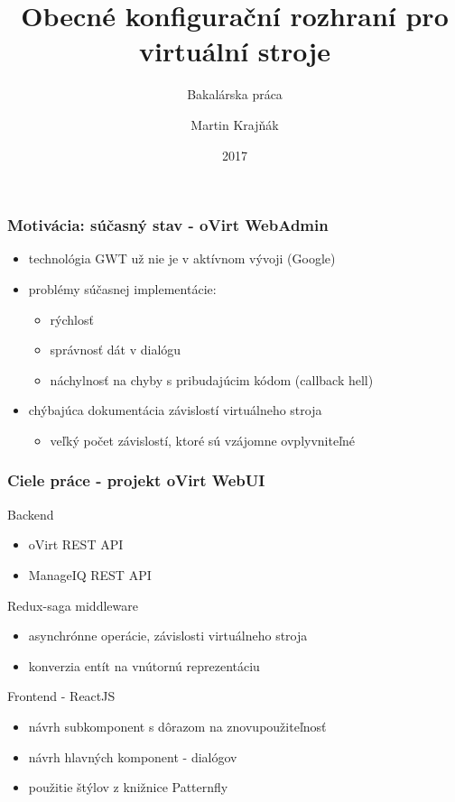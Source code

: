 \documentclass[pdf]{beamer}
\title[Obecné konfigurační rozhraní pro virtuální stroje \hspace{10mm} \insertframenumber/\inserttotalframenumber]{Obecné konfigurační rozhraní pro virtuální stroje}
\subtitle{Bakalárska práca}
\author{Martin Krajňák}
\date{2017}
\begin{document}
\begin{frame}
\titlepage
\end{frame}


\begin{frame}
\frametitle{Motivácia: súčasný stav - oVirt WebAdmin}
\begin{itemize}
\item technológia GWT už nie je v aktívnom vývoji (Google)
\item problémy súčasnej implementácie:
\begin{itemize}
\item rýchlosť
\item správnosť dát v dialógu
\item náchylnosť na chyby s pribudajúcim kódom (callback hell)
\end{itemize}
\item chýbajúca dokumentácia závislostí virtuálneho stroja 
\begin{itemize}
\item veľký počet závislostí, ktoré sú vzájomne ovplyvniteľné
\end{itemize}
\end{itemize}
\end{frame}


\begin{frame}
\frametitle{Ciele práce - projekt oVirt WebUI}
\begin{block}{Backend}

\begin{itemize}
\item oVirt REST API
\item ManageIQ REST API
\end{itemize}

\end{block}

\begin{block}{Redux-saga middleware}

\begin{itemize}
\item asynchrónne operácie, závislosti virtuálneho stroja
\item konverzia entít na vnútornú reprezentáciu
\end{itemize}

\end{block}

\begin{block}{Frontend - ReactJS}
\begin{itemize}
\item návrh subkomponent s dôrazom na znovupoužiteľnosť
\item návrh hlavných komponent - dialógov
\item použitie štýlov z knižnice Patternfly
\end{itemize}
\end{block}

\end{frame}
\end{document}
